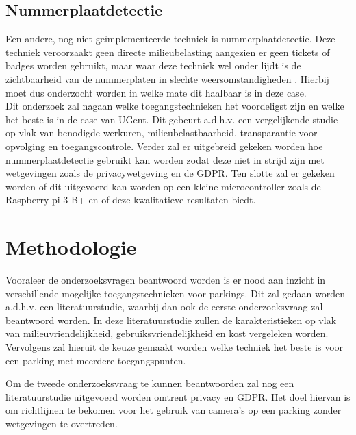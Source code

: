 \subsection{Nummerplaatdetectie}
Een andere, nog niet geïmplementeerde techniek is nummerplaatdetectie. Deze techniek veroorzaakt geen directe milieubelasting aangezien er geen tickets of badges worden gebruikt, maar waar deze techniek wel onder lijdt is de zichtbaarheid van de nummerplaten in slechte weersomstandigheden \autocite{azam2016automatic}. Hierbij moet dus onderzocht worden in welke mate dit haalbaar is in deze case.
\\
Dit onderzoek zal nagaan welke toegangstechnieken het voordeligst zijn en welke het beste is in de case van UGent. Dit gebeurt a.d.h.v. een vergelijkende studie op vlak van benodigde werkuren, milieubelastbaarheid, transparantie voor opvolging en toegangscontrole. Verder zal er uitgebreid gekeken worden hoe nummerplaatdetectie gebruikt kan worden zodat deze niet in strijd zijn met wetgevingen zoals de privacywetgeving en de GDPR. Ten slotte zal er gekeken worden of dit uitgevoerd kan worden op een kleine microcontroller zoals de Raspberry pi 3 B+ en of deze kwalitatieve resultaten biedt.


\section{Methodologie}
\label{sec:methodologie}

Vooraleer de onderzoeksvragen beantwoord worden is er nood aan inzicht in verschillende mogelijke toegangstechnieken voor parkings. Dit zal gedaan worden a.d.h.v. een literatuurstudie, waarbij dan ook de eerste onderzoeksvraag zal beantwoord worden. In deze literatuurstudie zullen de karakteristieken op vlak van milieuvriendelijkheid, gebruiksvriendelijkheid en kost vergeleken worden. Vervolgens zal hieruit de keuze gemaakt worden welke techniek het beste is voor een parking met meerdere toegangspunten.

Om de tweede onderzoeksvraag te kunnen beantwoorden zal nog een literatuurstudie uitgevoerd worden omtrent privacy en GDPR. Het doel hiervan is om richtlijnen te bekomen voor het gebruik van camera’s op een parking zonder wetgevingen te overtreden.


